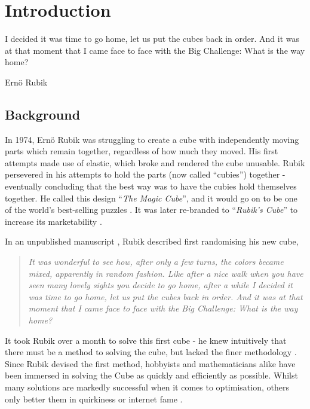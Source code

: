 \documentclass{report}
\newcommand{\tit}[1]{\textit{#1}}
\newcommand{\propernoun}[1]{\enquote{\tit{#1}}}
\begin{document}
	\newpage
	\tableofcontents
   	\listoffigures
	\listoftables

	\newpage
	\renewcommand{\thechapter}{\arabic{chapter}}
	\setcounter{chapter}{0}
	\chapter{Introduction}
	\epigraph{I decided it was time to go home, let us put the cubes back in order. And it was at that moment that I came face to face with the Big Challenge: What is the way home?}{Ern\"{o} Rubik \cite{Rubik1986}}
	
    \section{Background}

    In 1974, Ern\"{o} Rubik was struggling to create a cube with independently moving parts which remain together, regardless of how much they moved. His first attempts made use of elastic, which broke and rendered the cube unusable. Rubik persevered in his attempts to hold the parts (now called \enquote{cubies}) together - eventually concluding that the best way was to have the cubies hold themselves together. He called this design \propernoun{The Magic Cube}, and it would go on to be one of the world's best-selling puzzles \cite{Waxman2014}. It was later re-branded to \propernoun{Rubik's Cube} to increase its marketability \cite{IdealToyCompany1980}.
    
    In an unpublished manuscript \cite{Rubik1986}, Rubik described first randomising his new cube, 
    
    \blockquote{\tit{It was wonderful to see how, after only a few turns, the colors became mixed, apparently in random fashion. Like after a nice walk when you have seen many lovely sights you decide to go home, after a while I decided it was time to go home, let us put the cubes back in order. And it was at that moment that I came face to face with the Big Challenge: What is the way home?}}
    
    It took Rubik over a month to solve this first cube - he knew intuitively that there must be a method to solving the cube, but lacked the finer methodology \cite{RubiksCube2017}. Since Rubik devised the first method, hobbyists and mathematicians alike have been immersed in solving the Cube as quickly and efficiently as possible. Whilst many solutions are markedly successful when it comes to optimisation, others only better them in quirkiness or internet fame \cite{Chan2016}.
    
\end{document}
